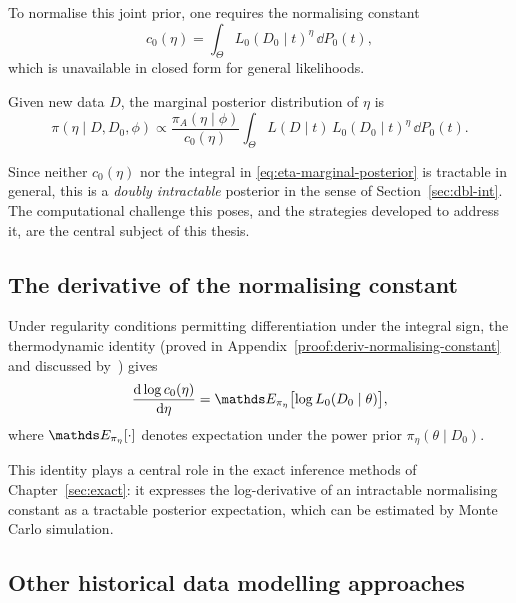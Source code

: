 To normalise this joint prior, one requires the normalising constant
\begin{equation}
    \label{eq:normalising-constant}
    c_0(\eta) = \int_{\Theta} L_0(D_0 \mid t)^{\eta}\, \dd P_0(t),
\end{equation}
which is unavailable in closed form for general likelihoods.

Given new data $D$, the marginal posterior distribution of $\eta$ is
\begin{equation}
    \label{eq:eta-marginal-posterior}
    \pi(\eta \mid D, D_0, \phi)
    \propto
    \frac{\pi_A(\eta \mid \phi)}{c_0(\eta)}
    \int_{\Theta} L(D \mid t)\, L_0(D_0 \mid t)^{\eta}\, \dd P_0(t).
\end{equation}

Since neither $c_0(\eta)$ nor the integral in \eqref{eq:eta-marginal-posterior} is tractable in general, this is a \textit{doubly intractable} posterior in the sense of Section~\ref{sec:dbl-int}.
The computational challenge this poses, and the strategies developed to address it, are the central subject of this thesis.

\subsection{The derivative of the normalising constant}
\label{subsec:deriv-normalising}

Under regularity conditions permitting differentiation under the integral sign, the thermodynamic identity (proved in Appendix~\ref{proof:deriv-normalising-constant} and discussed by~) gives
\begin{equation}
    \label{eq:normalising-constant-log}
    \dv{\log c_0(\eta)}{\eta}
    =
    \bE_{\pi_\eta}\bigl[\log L_0(D_0 \mid \theta)\bigr],
\end{equation}
where $\bE_{\pi_\eta}[\cdot]$ denotes expectation under the power prior $\pi_\eta(\theta \mid D_0)$.

This identity plays a central role in the exact inference methods of Chapter~\ref{sec:exact}: it expresses the log-derivative of an intractable normalising constant as a tractable posterior expectation, which can be estimated by Monte Carlo simulation.

\subsection{Other historical data modelling approaches}

